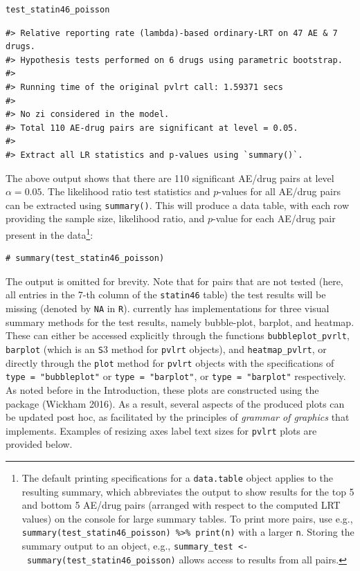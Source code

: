 \begin{verbatim}
test_statin46_poisson
\end{verbatim}

\begin{verbatim}
#> Relative reporting rate (lambda)-based ordinary-LRT on 47 AE & 7 drugs.
#> Hypothesis tests performed on 6 drugs using parametric bootstrap.
#> 
#> Running time of the original pvlrt call: 1.59371 secs
#> 
#> No zi considered in the model.
#> Total 110 AE-drug pairs are significant at level = 0.05.
#> 
#> Extract all LR statistics and p-values using `summary()`.
\end{verbatim}

The above output shows that there are 110 significant AE/drug pairs at level \(\alpha = 0.05\). The likelihood ratio test statistics and \(p\)-values for all AE/drug pairs can be extracted using \texttt{summary()}. This will produce a data table, with each row providing the sample size, likelihood ratio, and \(p\)-value for each AE/drug pair present in the data\footnote{The default printing specifications for a \texttt{data.table} object applies to the resulting summary, which abbreviates the output to show results for the top 5 and bottom 5 AE/drug pairs (arranged with respect to the computed LRT values) on the console for large summary tables. To print more pairs, use e.g., \texttt{summary(test\_statin46\_poisson)\ \%\textgreater{}\%\ print(n)} with a larger \texttt{n}. Storing the summary output to an object, e.g., \texttt{summary\_test\ \textless{}-\ summary(test\_statin46\_poisson)} allows access to results from all pairs.}:

\begin{verbatim}
# summary(test_statin46_poisson) 
\end{verbatim}

The output is omitted for brevity. Note that for pairs that are not tested (here, all entries in the 7-th column of the \texttt{statin46} table) the test results will be missing (denoted by \texttt{NA} in \texttt{R}).  currently has implementations for three visual summary methods for the test results, namely bubble-plot, barplot, and heatmap. These can either be accessed explicitly through the functions \texttt{bubbleplot\_pvrlt}, \texttt{barplot} (which is an \texttt{S}3 method for \texttt{pvlrt} objects), and \texttt{heatmap\_pvlrt}, or directly through the \texttt{plot} method for \texttt{pvlrt} objects with the specifications of \texttt{type\ =\ "bubbleplot"} or \texttt{type\ =\ "barplot"}, or \texttt{type\ =\ "barplot"} respectively. As noted before in the Introduction, these plots are constructed using the  package (Wickham 2016). As a result, several aspects of the produced plots can be updated post hoc, as facilitated by the principles of \emph{grammar of graphics} that  implements. Examples of resizing axes label text sizes for \texttt{pvlrt} plots are provided below.

